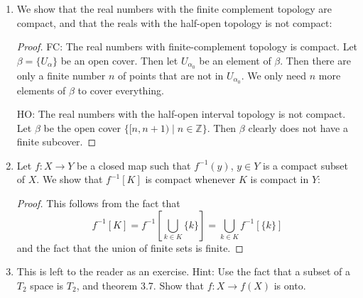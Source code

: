 \documentclass{book}
\begin{document}
\begin{enumerate}[(1)]
    \item We show that the real numbers with the finite complement topology are compact, and that the reals with the half-open topology is not compact: 
        \begin{proof} FC: The real numbers with finite-complement topology is compact.  Let $\beta=\{U_\alpha\}$ be an open cover.  Then let $U_{\alpha_0}$ be an element of $\beta$.  Then there are only a finite number $n$ of points that are not in $U_{\alpha_0}$.  We only need $n$ more elements of $\beta$ to cover everything.
            \par HO: The real numbers with the half-open interval topology is not compact.  Let $\beta$ be the open cover $\{[n,n+1)\mid n\in\mathbb Z\}$.  Then $\beta$ clearly does not have a finite subcover.
        \end{proof}

    \item Let $f: X \rightarrow Y$ be a closed map such that $f^{-1}(y)$, $y \in Y$ is a compact subset of $X$. We show that $f^{-1}[K]$ is compact whenever $K$ is compact in $Y$: 
        \begin{proof} This follows from the fact that 
            \[f^{-1}[K] = f^{-1}[\bigcup_{k \in K} \{k\}] = \bigcup_{k \in K} f^{-1}[\{k\}]\]
            and the fact that the union of finite sets is finite. 
        \end{proof}

    \item This is left to the reader as an exercise. Hint: Use the fact that a subset of a $T_2$ space is $T_2$, and theorem 3.7. Show that $f: X \rightarrow f(X)$ is onto. 


\end{enumerate}
\end{document}
